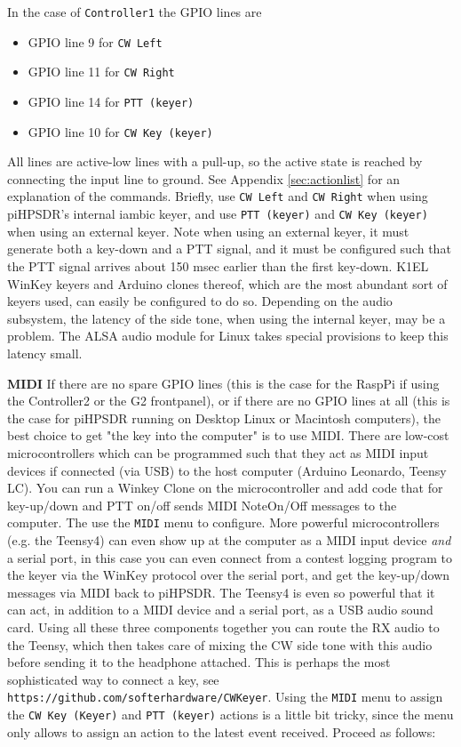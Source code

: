 \documentclass[12pt]{book}
\def\bltt#1{\texttt{\color{blue}#1}}
\begin{document}
In the case of \texttt{Controller1} the GPIO lines are

\begin{itemize}
\item{GPIO line 9 for \bltt{CW Left}}
\item{GPIO line 11 for \bltt{CW Right}}
\item{GPIO line 14 for \bltt{PTT (keyer)}}
\item{GPIO line 10 for \bltt{CW Key (keyer)}}
\end{itemize}

All lines are active-low lines with a pull-up, so the active state is reached
by connecting the input line to ground. See Appendix \ref{sec:actionlist} for
an explanation of the commands. Briefly, use \bltt{CW Left} and \bltt{CW Right}
when using piHPSDR's internal iambic keyer, and use \bltt{PTT (keyer)} and
\bltt{CW Key (keyer)} when using an external keyer. Note when using an external
keyer, it must generate both a key-down and a PTT signal, and it must be configured
such that the PTT signal arrives about 150 msec earlier than the first key-down.
K1EL WinKey keyers and Arduino clones thereof, which are the most abundant sort
of keyers used, can easily be configured to do so. Depending on the audio subsystem,
the latency of the side tone, when using the internal keyer, may be a problem.
The ALSA audio module for Linux takes special provisions to
keep this latency small.

\textbf{MIDI}
If there are no spare GPIO lines (this is the case for the RaspPi if using the
Controller2 or the G2 frontpanel), or if there are no GPIO lines at all (this is
the case for piHPSDR running on Desktop Linux or Macintosh computers), the best
choice to get "the key into the computer" is to use MIDI. There are low-cost
microcontrollers which can be programmed such that they act as MIDI input devices
if connected (via USB) to the host computer (Arduino Leonardo, Teensy LC). You can
run a Winkey Clone on the microcontroller and add code that for key-up/down and
PTT on/off sends MIDI NoteOn/Off messages to the computer. The use the
\bltt{MIDI} menu to configure. More powerful microcontrollers (e.g. the Teensy4)
can even show up at the computer as a MIDI input device \textit{and} a serial port,
in this case you can even connect from a contest logging program to  the keyer
via the WinKey protocol over the serial port, and get the key-up/down messages
via MIDI back to piHPSDR. The Teensy4 is even so powerful that it can act, in
addition to a MIDI device and a serial port, as a USB audio sound card.
Using all these three components together you can route the RX audio to the
Teensy, which then takes care of mixing the CW side tone with this audio
before sending it to the headphone attached. This is perhaps the most
sophisticated way to connect a key, see \texttt{https://github.com/softerhardware/CWKeyer}.
Using the \bltt{MIDI} menu to assign the \bltt{CW Key (Keyer)} and \bltt{PTT (keyer)}
actions is a little bit tricky, since the menu only allows to assign an action to
the latest event received. Proceed as follows:
\end{document}
